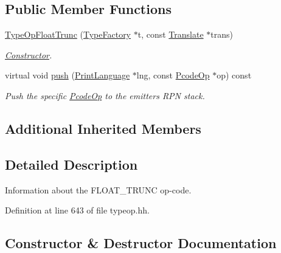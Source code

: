 \subsection*{Public Member Functions}
\begin{DoxyCompactItemize}
\item 
\mbox{\hyperlink{class_type_op_float_trunc_aea6458a8420fef0f9c83281f5557fda5}{Type\+Op\+Float\+Trunc}} (\mbox{\hyperlink{class_type_factory}{Type\+Factory}} $\ast$t, const \mbox{\hyperlink{class_translate}{Translate}} $\ast$trans)
\begin{DoxyCompactList}\small\item\em \mbox{\hyperlink{class_constructor}{Constructor}}. \end{DoxyCompactList}\item 
virtual void \mbox{\hyperlink{class_type_op_float_trunc_a1abcf620c37217e745f4bc6b17d1f4a2}{push}} (\mbox{\hyperlink{class_print_language}{Print\+Language}} $\ast$lng, const \mbox{\hyperlink{class_pcode_op}{Pcode\+Op}} $\ast$op) const
\begin{DoxyCompactList}\small\item\em Push the specific \mbox{\hyperlink{class_pcode_op}{Pcode\+Op}} to the emitter\textquotesingle{}s R\+PN stack. \end{DoxyCompactList}\end{DoxyCompactItemize}
\subsection*{Additional Inherited Members}


\subsection{Detailed Description}
Information about the F\+L\+O\+A\+T\+\_\+\+T\+R\+U\+NC op-\/code. 

Definition at line 643 of file typeop.\+hh.



\subsection{Constructor \& Destructor Documentation}
\mbox{\label{class_type_op_float_trunc_aea6458a8420fef0f9c83281f5557fda5}} 
